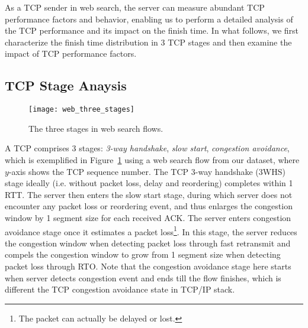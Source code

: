 As a TCP sender in web search, the server can measure abundant TCP performance factors and behavior, enabling us to perform a detailed analysis of the TCP performance and its impact on the finish time. In what follows, we first characterize the finish time distribution in 3 TCP stages and then examine the impact of TCP performance factors.



\subsection{TCP Stage Anaysis}

\begin{figure}[th]
\centering
\texttt{[image: web\_three\_stages]}
\caption{The three stages in web search flows.}
\label{fig:web_three_stages}
\end{figure}

A TCP comprises 3 stages: \emph{3-way handshake}, \emph{slow start}, \emph{congestion avoidance}, which is exemplified in Figure~\ref{fig:web_three_stages} using a web search flow from our dataset, where $y$-axis shows the TCP sequence number. The TCP 3-way handshake (3WHS) stage ideally (i.e. without packet loss, delay and reordering) completes within 1 RTT. The server then enters the slow start stage, during which server does not encounter any packet loss or reordering event, and thus enlarges the congestion window by 1 segment size for each received ACK. The server enters congestion avoidance stage once it estimates a packet loss\footnote{The packet can actually be delayed or lost.}. In this stage, the server reduces the congestion window when detecting packet loss through fast retransmit\cite{jacobson1988congestion} and compels the congestion window to grow from 1 segment size when detecting packet loss through RTO. Note that the congestion avoidance stage here starts when server detects congestion event and ends till the flow finishes, which is different the TCP congestion avoidance state in TCP/IP stack. 



